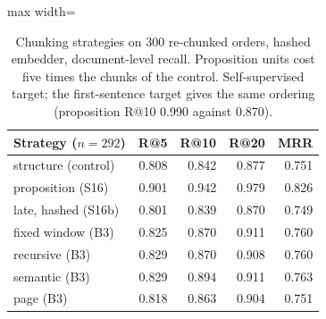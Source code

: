 \begin{table}[!t]
\centering\small\setlength{\tabcolsep}{3.5pt}
\begin{adjustbox}{max width=\columnwidth}
\begin{tabular}{@{}lrrrr@{}}
\toprule
Strategy ($n=292$) & R@5 & R@10 & R@20 & MRR \\
\midrule
structure (control) & 0.808 & 0.842 & 0.877 & 0.751 \\
proposition (S16) & 0.901 & 0.942 & 0.979 & 0.826 \\
late, hashed (S16b) & 0.801 & 0.839 & 0.870 & 0.749 \\
fixed window (B3) & 0.825 & 0.870 & 0.911 & 0.760 \\
recursive (B3) & 0.829 & 0.870 & 0.908 & 0.760 \\
semantic (B3) & 0.829 & 0.894 & 0.911 & 0.763 \\
page (B3) & 0.818 & 0.863 & 0.904 & 0.751 \\
\bottomrule
\end{tabular}
\end{adjustbox}
\caption{Chunking strategies on 300 re-chunked orders, hashed embedder, document-level recall. Proposition units cost five times the chunks of the control. Self-supervised target; the first-sentence target gives the same ordering (proposition R@10 0.990 against 0.870).}
\label{tab:s16}
\end{table}


